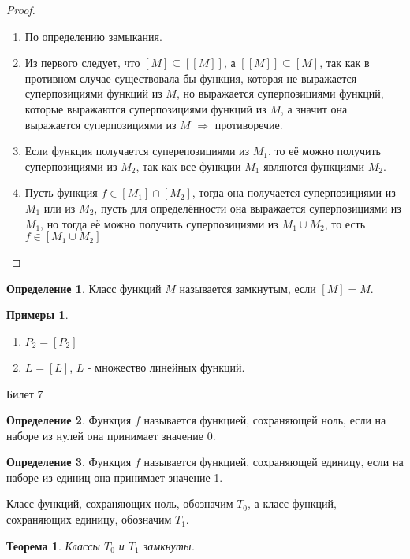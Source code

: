 \documentclass[a4paper, 12pt]{article}
\theoremstyle{definition}
\newtheorem*{definition}{Определение}
\newtheorem*{example}{Примеры}
\theoremstyle{plain}
\newtheorem*{theorem}{Теорема}
\theoremstyle{remark}
\begin{document}
  \begin{proof}
    \begin{enumerate}
      \item По определению замыкания.
      \item Из первого следует, что $[M]\subseteq[[M]]$, а $[[M]]\subseteq[M]$, так как в противном случае существовала бы функция, которая не выражается суперпозициями функций из $M$, но выражается суперпозициями функций, которые выражаются суперпозициями функций из $M$, а значит она выражается суперпозициями из $M$ $\Longrightarrow$ противоречие.
      \item Если функция получается суперепозициями из $M_1$, то её можно получить суперпозициями из $M_2$, так как все функции $M_1$ являются функциями $M_2$.
      \item Пусть функция $f\in[M_1]\cap[M_2]$, тогда она получается суперпозициями из $M_1$ или из $M_2$, пусть для определённости она выражается суперпозициями из $M_1$, но тогда её можно получить суперпозициями из $M_1\cup M_2$, то есть $f\in[M_1\cup M_2]$
    \end{enumerate}
  \end{proof}
  \begin{definition}
    Класс функций $M$ называется замкнутым, если $[M]=M$.
  \end{definition}
  \begin{example}
    \begin{enumerate}
      \item $P_2=[P_2]$
      \item $L=[L]$, $L$ - множество линейных функций.
    \end{enumerate}
  \end{example}
  \begin{center}
    Билет 7
  \end{center}
  \begin{definition}
    Функция $f$ называется функцией, сохраняющей ноль, если на наборе из нулей она принимает значение 0. 
  \end{definition}
  \begin{definition}
    Функция $f$ называется функцией, сохраняющей единицу, если на наборе из единиц она принимает значение 1. 
  \end{definition}
  Класс функций, сохраняющих ноль, обозначим $T_0$, а класс функций, сохраняющих единицу, обозначим $T_1$.
  \begin{theorem}
    Классы $T_0$ и $T_1$ замкнуты.
  \end{theorem}
\end{document}
